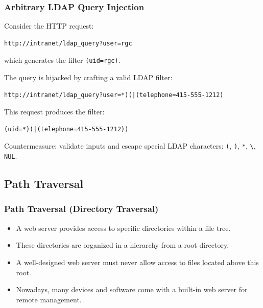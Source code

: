 \documentclass{beamer}
\def\emptyline{\vspace{10pt}}
\begin{document}
\begin{frame}[fragile]
\frametitle{Arbitrary LDAP Query Injection}
Consider the HTTP request:
\begin{verbatim}
http://intranet/ldap_query?user=rgc
\end{verbatim}
which generates the filter \texttt{(uid=rgc)}.

\emptyline
The query is hijacked by crafting a valid LDAP filter:
\begin{small}
\begin{verbatim}
http://intranet/ldap_query?user=*)(|(telephone=415-555-1212)
\end{verbatim}
\end{small}
This request produces the filter:
\begin{verbatim}
(uid=*)(|(telephone=415-555-1212))
\end{verbatim}

\alert{Countermeasure}: validate inputs and escape special LDAP characters: \texttt{(}, \texttt{)}, \texttt{*}, \texttt{\textbackslash}, \texttt{NUL}.
\end{frame}


\subsection{Path Traversal}

\begin{frame}
\frametitle{Path Traversal (Directory Traversal)}

\begin{itemize}
\item A web server provides access to specific directories within a file tree.
\item These directories are organized in a hierarchy from a root directory.
\item A well-designed web server must \alert{never} allow access to files located above this root.
\item Nowadays, many devices and software come with a built-in web server for remote management.
\end{itemize}
\end{frame}
\end{document}
